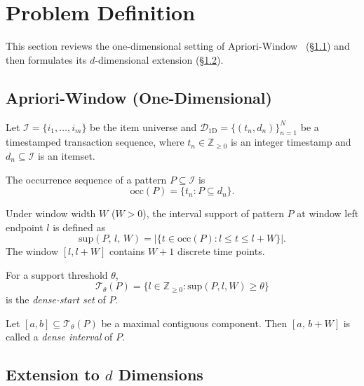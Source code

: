 \section{Problem Definition}\label{sec:problem}

This section reviews the one-dimensional setting
of Apriori-Window~\cite{aprioriwindow} (\S\ref{sec:1d_review})
and then formulates its $d$-dimensional extension (\S\ref{sec:nd_extension}).

\subsection{Apriori-Window (One-Dimensional)}\label{sec:1d_review}

Let $\mathcal{I} = \{i_1, \ldots, i_m\}$ be the item universe and
$\mathcal{D}_{\mathrm{1D}} = \{(t_n, d_n)\}_{n=1}^N$
be a timestamped transaction sequence,
where $t_n \in \mathbb{Z}_{\geq 0}$ is an integer timestamp
and $d_n \subseteq \mathcal{I}$ is an itemset.

The occurrence sequence of a pattern $P \subseteq \mathcal{I}$ is
\[
  \mathrm{occ}(P) = \{t_n : P \subseteq d_n\}.
\]

\begin{definition}\label{def:sup1d}
Under window width $W$ ($W > 0$),
the interval support of pattern $P$
at window left endpoint $l$ is defined as
\[
  \mathrm{sup}(P,\, l,\, W)
  = \bigl|\{t \in \mathrm{occ}(P) : l \leq t \leq l + W\}\bigr|.
\]
The window $[l, l+W]$ contains $W+1$ discrete time points.
\end{definition}

\begin{definition}\label{def:dense1d}
For a support threshold $\theta$,
\[
  \mathcal{T}_\theta(P)
  = \{l \in \mathbb{Z}_{\geq 0} : \mathrm{sup}(P, l, W) \geq \theta\}
\]
is the \emph{dense-start set} of $P$.

Let $[a,b] \subseteq \mathcal{T}_\theta(P)$
be a maximal contiguous component.
Then $[a,\, b + W]$ is called a \emph{dense interval} of $P$.
\end{definition}


\subsection{Extension to $d$ Dimensions}\label{sec:nd_extension}

